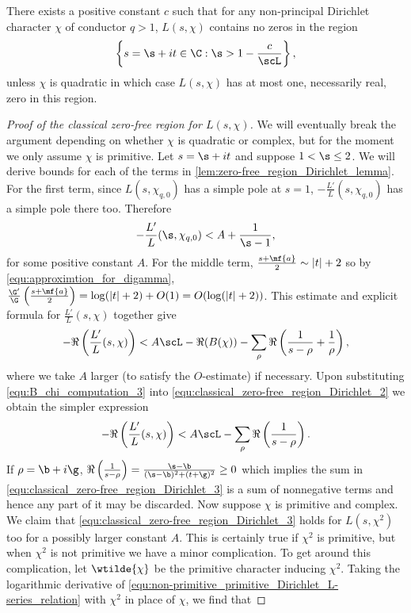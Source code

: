       \begin{theorem}
        There exists a positive constant $c$ such that for any non-principal Dirichlet character $\chi$ of conductor $q > 1$, $L(s,\chi)$ contains no zeros in the region
        \[
          \left\{s = \s+it \in \C:\s > 1-\frac{c}{\scL}\right\},
        \]
        unless $\chi$ is quadratic in which case $L(s,\chi)$ has at most one, necessarily real, zero in this region.
      \end{theorem}
      \begin{proof}[Proof of the classical zero-free region for $L(s,\chi)$]
        We will eventually break the argument depending on whether $\chi$ is quadratic or complex, but for the moment we only assume $\chi$ is primitive. Let $s = \s+it$ and suppose $1 < \s \le 2$. We will derive bounds for each of the terms in \cref{lem:zero-free_region_Dirichlet_lemma}. For the first term, since $L(s,\chi_{q,0})$ has a simple pole at $s = 1$, $-\frac{L'}{L}(s,\chi_{q,0})$ has a simple pole there too. Therefore
        \begin{equation}\label{equ:classical_zero-free_region_Dirichlet_1}
          -\frac{L'}{L}(\s,\chi_{q,0}) < A+\frac{1}{\s-1},
        \end{equation}
        for some positive constant $A$. For the middle term, $\frac{s+\mf{a}}{2} \sim |t|+2$ so by \cref{equ:approximtion_for_digamma}, $\frac{\G'}{\G}\left(\frac{s+\mf{a}}{2}\right) = \log(|t|+2)+O(1) = O(\log(|t|+2))$. This estimate and explicit formula for $\frac{L'}{L}(s,\chi)$ together give
        \begin{equation}\label{equ:classical_zero-free_region_Dirichlet_2}
          -\Re\left(\frac{L'}{L}(s,\chi)\right) < A\scL-\Re(B(\chi))-\sum_{\rho}\Re\left(\frac{1}{s-\rho}+\frac{1}{\rho}\right),
        \end{equation}
        where we take $A$ larger (to satisfy the $O$-estimate) if necessary. Upon substituting \cref{equ:B_chi_computation_3} into \cref{equ:classical_zero-free_region_Dirichlet_2} we obtain the simpler expression
        \begin{equation}\label{equ:classical_zero-free_region_Dirichlet_3}
          -\Re\left(\frac{L'}{L}(s,\chi)\right) < A\scL-\sum_{\rho}\Re\left(\frac{1}{s-\rho}\right).
        \end{equation}
        If $\rho = \b+i\g$, $\Re\left(\frac{1}{s-\rho}\right) = \frac{\s-\b}{(\s-\b)^{2}+(t+\g)^{2}} \ge 0$ which implies the sum in \cref{equ:classical_zero-free_region_Dirichlet_3} is a sum of nonnegative terms and hence any part of it may be discarded. Now suppose $\chi$ is primitive and complex. We claim that \cref{equ:classical_zero-free_region_Dirichlet_3} holds for $L(s,\chi^{2})$ too for a possibly larger constant $A$. This is certainly true if $\chi^{2}$ is primitive, but when $\chi^{2}$ is not primitive we have a minor complication. To get around this complication, let $\wtilde{\chi}$ be the primitive character inducing $\chi^{2}$. Taking the logarithmic derivative of \cref{equ:non-primitive_primitive_Dirichlet_L-series_relation} with $\chi^{2}$ in place of $\chi$, we find that

\end{proof}
